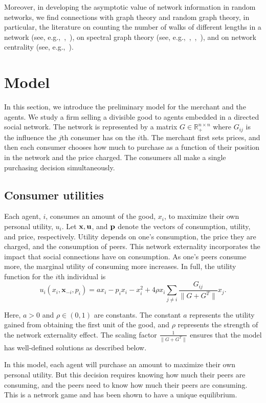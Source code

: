 	Moreover, in developing the asymptotic value
	of network information in random networks, we find connections
	with graph theory and random graph theory, in particular, the literature on counting
	the number of walks of different lengths in a network
	(see, e.g.,~\cite{fiol2009number},~\cite{levin2017counting}), on spectral
	graph theory (see, e.g.,~\cite{krivelevich2003largest},~\cite{chung2004spectra},~\cite{preciado2017moment}), and on
	network centrality (see, e.g.,~\cite{bonacich1987power}).


\section{Model}\label{sec:pricing:model}
In this section, we introduce the preliminary model for the merchant and the agents. We study a firm selling a divisible good to agents embedded in a directed social network. The network is represented by a matrix $G \in \mathbb{R}^{n\times n}_{+}$ where $G_{ij}$ is the influence the $j$th consumer has on the $i$th.   The merchant first sets prices, and then each consumer chooses how much to purchase as a function of their position in the network and the price charged. The consumers all make a single purchasing decision simultaneously. 

  
\subsection{Consumer utilities}
Each agent, $i$, consumes an amount of the good, $x_i$, to maximize their own personal utility, $u_i$. Let $\mathbf{x},\mathbf{u}$, and $\mathbf{p}$ denote the vectors of consumption, utility, and price, respectively. Utility depends on one's consumption, the price they are charged, and the consumption of peers. This network externality incorporates the impact that social connections have on consumption. As one's peers consume more, the marginal   utility of consuming more increases.  In full, the utility function for the $i$th individual is 
\[u_i(x_i, \mathbf{x}_{-i}, p_i) = ax_i - p_i x_i - x_i^2 + 4\rho x_i \sum_{j\neq i} \frac{G_{ij}}{\| G +G^T\|}x_j .\]

Here, $a>0$ and $\rho \in (0,1)$ are constants. The constant $a$ represents the utility gained from obtaining the first unit of the good, and $\rho$ represents the strength of the network externality effect.  The scaling factor $\frac{1}{\|G+G^T\|}$ ensures that the model has well-defined solutions as described below. 

In this model, each agent will purchase an amount to maximize their own personal utility. But this decision requires knowing how much their peers are consuming, and the peers need to know how much their peers are consuming.  This is a network game and has been shown to have a unique equilibrium. 

